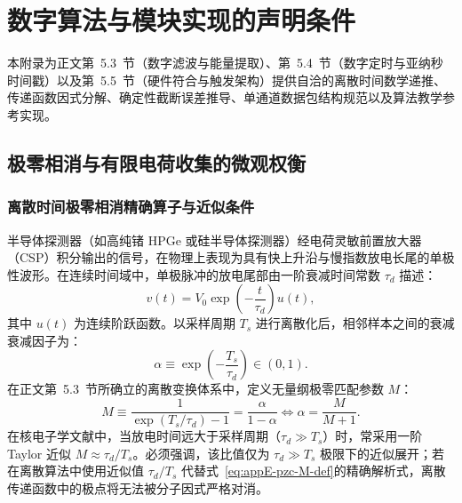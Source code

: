 \chapter{数字算法与模块实现的声明条件}\label{app:digital-algorithms}

本附录为正文第~5.3~节（数字滤波与能量提取）、第~5.4~节（数字定时与亚纳秒时间戳）以及第~5.5~节（硬件符合与触发架构）提供自洽的离散时间数学递推、传递函数因式分解、确定性截断误差推导、单通道数据包结构规范以及算法教学参考实现。

\section{极零相消与有限电荷收集的微观权衡}\label{sec:appE-pzc}

\subsection{离散时间极零相消精确算子与近似条件}

半导体探测器（如高纯锗 HPGe 或硅半导体探测器）经电荷灵敏前置放大器（CSP）积分输出的信号，在物理上表现为具有快上升沿与慢指数放电长尾的单极性波形。在连续时间域中，单极脉冲的放电尾部由一阶衰减时间常数 $\tau_d$ 描述：
\begin{equation}\label{eq:appE-preamp-decay}
v(t) = V_0 \exp\left(-\frac{t}{\tau_d}\right) u(t),
\end{equation}
其中 $u(t)$ 为连续阶跃函数。以采样周期 $T_s$ 进行离散化后，相邻样本之间的衰减衰减因子为：
\begin{equation}\label{eq:appE-discrete-pole-factor}
\alpha \equiv \exp\left(-\frac{T_s}{\tau_d}\right) \in (0, 1).
\end{equation}
在正文第~5.3~节所确立的离散变换体系中，定义无量纲极零匹配参数 $M$：
\begin{equation}\label{eq:appE-pzc-M-def}
M \equiv \frac{1}{\exp(T_s/\tau_d) - 1} = \frac{\alpha}{1 - \alpha} \iff \alpha = \frac{M}{M + 1}.
\end{equation}
在核电子学文献中，当放电时间远大于采样周期（$\tau_d \gg T_s$）时，常采用一阶 Taylor 近似 $M \approx \tau_d / T_s$。必须强调，该比值仅为 $\tau_d \gg T_s$ 极限下的近似展开；若在离散算法中使用近似值 $\tau_d / T_s$ 代替式~\eqref{eq:appE-pzc-M-def}的精确解析式，离散传递函数中的极点将无法被分子因式严格对消。

